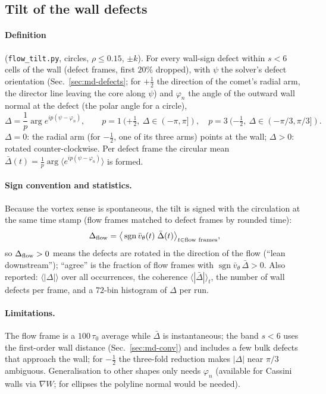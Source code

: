 \subsection{Tilt of the wall defects}
\label{sec:md-tilt}

\paragraph{Definition} (\texttt{flow\_tilt.py}, circles, $\rho\le0.15$, $\pm k$). For every wall-sign defect within $s<6$ cells of the wall
(defect frames, first $20\%$ dropped), with $\psi$ the solver's defect orientation (Sec.~\ref{sec:md-defects}; for $+\tfrac12$ the direction
of the comet's radial arm, the director line leaving the core along $\psi$) and $\varphi_n$ the angle of the outward wall normal at the defect
(the polar angle for a circle),
\begin{equation}
  \Delta=\frac1p\arg e^{ip(\psi-\varphi_n)},\qquad p=1\ (+\tfrac12,\ \Delta\in(-\pi,\pi]),\quad p=3\ (-\tfrac12,\ \Delta\in(-\pi/3,\pi/3]).
\end{equation}
$\Delta=0$: the radial arm (for $-\tfrac12$, one of its three arms) points at the wall; $\Delta>0$: rotated counter-clockwise.
Per defect frame the circular mean $\bar\Delta(t)=\frac1p\arg\langle e^{ip(\psi-\varphi_n)}\rangle$ is formed.
\paragraph{Sign convention and statistics.} Because the vortex sense is spontaneous, the tilt is signed with the circulation at the same time
stamp (flow frames matched to defect frames by rounded time):
\begin{equation}
  \Delta_{\rm flow}=\big\langle\operatorname{sgn}\bar v_\theta(t)\;\bar\Delta(t)\big\rangle_{t\in\text{flow frames}},
\end{equation}
so $\Delta_{\rm flow}>0$ means the defects are rotated in the direction of the flow (``lean downstream''); ``agree'' is the fraction of flow frames
with $\operatorname{sgn}\bar v_\theta\,\bar\Delta>0$. Also reported: $\langle|\Delta|\rangle$ over all occurrences, the coherence
$\langle|\bar\Delta|\rangle_t$, the number of wall defects per frame, and a $72$-bin histogram of $\Delta$ per run.
\paragraph{Limitations.} The flow frame is a $100\,\tau_0$ average while $\bar\Delta$ is instantaneous; the band $s<6$ uses the first-order wall
distance (Sec.~\ref{sec:md-conv}) and includes a few bulk defects that approach the wall; for $-\tfrac12$ the three-fold reduction makes
$|\Delta|$ near $\pi/3$ ambiguous. Generalisation to other shapes only needs $\varphi_n$ (available for Cassini walls via $\nabla W$; for
ellipses the polyline normal would be needed).

